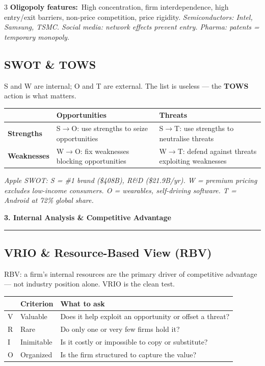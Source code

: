 \documentclass[7.6pt,letterpaper]{article}
\newcommand{\secbar}[1]{%
    \vspace{2pt}\noindent\textbf{#1}\par\vspace{1pt}\hrule\vspace{2pt}%
  }
\newcommand{\secbar}[1]{%
    \vspace{3pt}%
    \noindent\colorbox{navy}{\parbox{\dimexpr\linewidth-2\fboxsep}{%
      \fontsize{6.8pt}{8pt}\sffamily\bfseries\color{white}\strut\ #1\strut}}%
    \vspace{1pt}\par%
  }
\newcommand{\T}[1]{\textbf{\color{navy}#1}}
\newcommand{\kk}[2]{\noindent\T{#1}\ #2\par}
\newcommand{\eg}[1]{\textit{\color{mid}#1}}
\newcommand{\sh}{\rowcolor{strip}}
\newcommand{\ctab}[1]{{\fontsize{6.2pt}{7pt}\selectfont\setlength{\tabcolsep}{2.5pt}#1}}
\begin{document}
\begin{multicols}{3}
\kk{Oligopoly features:}{High concentration, firm interdependence, high entry/exit barriers, non-price competition, price rigidity. \eg{Semiconductors: Intel, Samsung, TSMC. Social media: network effects prevent entry. Pharma: patents = temporary monopoly.}}

\subsection{SWOT \& TOWS}

S and W are internal; O and T are external. The list is useless --- the \T{TOWS} action is what matters.

\ctab{\begin{tabular}{@{}p{1.0cm}p{2.0cm}p{2.6cm}@{}}
\toprule
\sh & \T{Opportunities} & \T{Threats} \\
\midrule
\T{Strengths} & S$\to$O: use strengths to seize opportunities & S$\to$T: use strengths to neutralise threats \\
\T{Weaknesses} & W$\to$O: fix weaknesses blocking opportunities & W$\to$T: defend against threats exploiting weaknesses \\
\bottomrule
\end{tabular}}

\eg{Apple SWOT: S = \#1 brand (\$408B), R\&D (\$21.9B/yr). W = premium pricing excludes low-income consumers. O = wearables, self-driving software. T = Android at 72\% global share.}

\secbar{3. Internal Analysis \& Competitive Advantage}

\subsection{VRIO \& Resource-Based View (RBV)}

RBV: a firm's internal resources are the primary driver of competitive advantage --- not industry position alone. VRIO is the clean test.

\ctab{\begin{tabular}{@{}p{0.5cm}p{1.5cm}p{3.6cm}@{}}
\toprule
\sh \T{} & \T{Criterion} & \T{What to ask} \\
\midrule
V & Valuable & Does it help exploit an opportunity or offset a threat? \\
R & Rare & Do only one or very few firms hold it? \\
I & Inimitable & Is it costly or impossible to copy or substitute? \\
O & Organized & Is the firm structured to capture the value? \\
\bottomrule
\end{tabular}}


\end{multicols}
\end{document}
